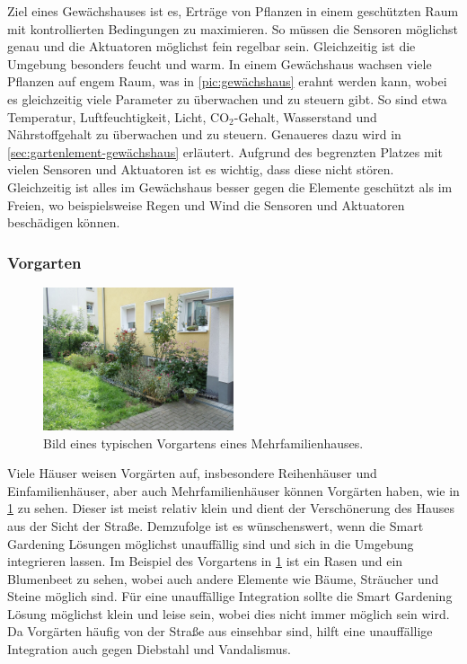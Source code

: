 Ziel eines Gewächshauses ist es, Erträge von Pflanzen in einem geschützten Raum mit kontrollierten Bedingungen zu maximieren.
So müssen die Sensoren möglichst genau und die Aktuatoren möglichst fein regelbar sein.
Gleichzeitig ist die Umgebung besonders feucht und warm.
In einem Gewächshaus wachsen viele Pflanzen auf engem Raum, was in \cref{pic:gewächshaus} erahnt werden kann, wobei es gleichzeitig viele Parameter zu überwachen und zu steuern gibt.
So sind etwa Temperatur, Luftfeuchtigkeit, Licht, CO$_2$-Gehalt, Wasserstand und Nährstoffgehalt zu überwachen und zu steuern.
Genaueres dazu wird in \cref{sec:gartenlement-gewächshaus} erläutert.
Aufgrund des begrenzten Platzes mit vielen Sensoren und Aktuatoren ist es wichtig, dass diese nicht stören.
Gleichzeitig ist alles im Gewächshaus besser gegen die Elemente geschützt als im Freien, wo beispielsweise Regen und Wind die Sensoren und Aktuatoren beschädigen können.

\subsubsection{Vorgarten}
\begin{figure}[!htb]
	\centering
	\includegraphics[width=0.5\textwidth]{images/Vorgarten.jpg}
	\caption[Bild eines typischen Vorgartens eines Mehrfamilienhauses.]{Bild eines typischen Vorgartens eines Mehrfamilienhauses.\footnotemark}
	\label{pic:vorgarten}
\end{figure}


Viele Häuser weisen Vorgärten auf, insbesondere Reihenhäuser und Einfamilienhäuser, aber auch Mehrfamilienhäuser können Vorgärten haben, wie in \cref{pic:vorgarten} zu sehen.
Dieser ist meist relativ klein und dient der Verschönerung des Hauses aus der Sicht der Straße.
Demzufolge ist es wünschenswert, wenn die Smart Gardening Lösungen möglichst unauffällig sind und sich in die Umgebung integrieren lassen.
Im Beispiel des Vorgartens in \cref{pic:vorgarten} ist ein Rasen und ein Blumenbeet zu sehen, wobei auch andere Elemente wie Bäume, Sträucher und Steine möglich sind.
Für eine unauffällige Integration sollte die Smart Gardening Lösung möglichst klein und leise sein, wobei dies nicht immer möglich sein wird.
Da Vorgärten häufig von der Straße aus einsehbar sind, hilft eine unauffällige Integration auch gegen Diebstahl und Vandalismus.


